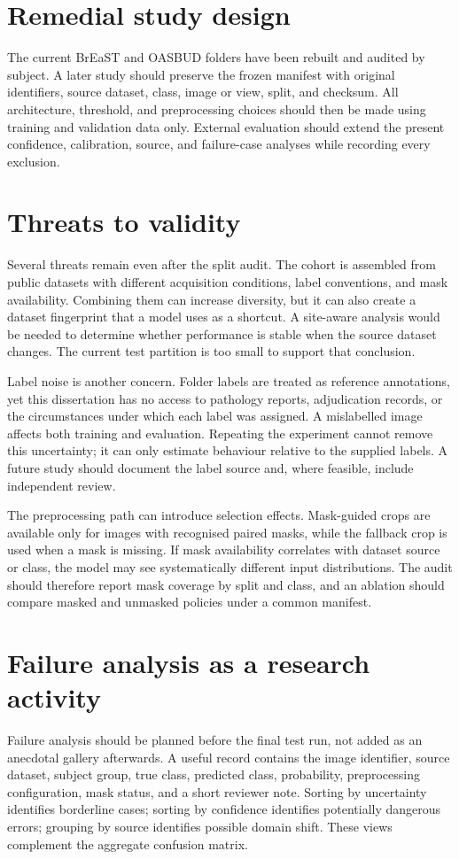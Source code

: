 \section{Remedial study design}
The current BrEaST and OASBUD folders have been rebuilt and audited by subject. A later study should preserve the frozen manifest with original identifiers, source dataset, class, image or view, split, and checksum. All architecture, threshold, and preprocessing choices should then be made using training and validation data only. External evaluation should extend the present confidence, calibration, source, and failure-case analyses while recording every exclusion.

\section{Threats to validity}
Several threats remain even after the split audit. The cohort is assembled from public datasets with different acquisition conditions, label conventions, and mask availability. Combining them can increase diversity, but it can also create a dataset fingerprint that a model uses as a shortcut. A site-aware analysis would be needed to determine whether performance is stable when the source dataset changes. The current test partition is too small to support that conclusion.

Label noise is another concern. Folder labels are treated as reference annotations, yet this dissertation has no access to pathology reports, adjudication records, or the circumstances under which each label was assigned. A mislabelled image affects both training and evaluation. Repeating the experiment cannot remove this uncertainty; it can only estimate behaviour relative to the supplied labels. A future study should document the label source and, where feasible, include independent review.

The preprocessing path can introduce selection effects. Mask-guided crops are available only for images with recognised paired masks, while the fallback crop is used when a mask is missing. If mask availability correlates with dataset source or class, the model may see systematically different input distributions. The audit should therefore report mask coverage by split and class, and an ablation should compare masked and unmasked policies under a common manifest.

\section{Failure analysis as a research activity}
Failure analysis should be planned before the final test run, not added as an anecdotal gallery afterwards. A useful record contains the image identifier, source dataset, subject group, true class, predicted class, probability, preprocessing configuration, mask status, and a short reviewer note. Sorting by uncertainty identifies borderline cases; sorting by confidence identifies potentially dangerous errors; grouping by source identifies possible domain shift. These views complement the aggregate confusion matrix.

